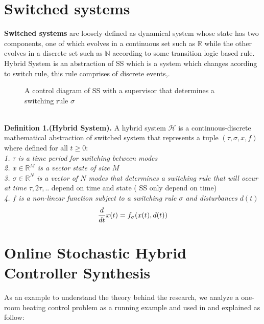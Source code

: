   \section{Switched systems}
    \label{sec:switchedsystems}
    \textbf{Switched systems} are loosely defined as dynamical 
    system whose state has two components, one of which evolves 
    in a continuous set such as $\mathbb{R}$  while the other 
    evolves in a discrete set such as $\mathbb{N}$ according to 
    some transition logic based rule. Hybrid System is an abstraction
    of \ac{SS} which is a system which changes acording to switch 
    rule, this rule comprises of discrete events,\citep{branicky1994stability}.    
    \begin{figure}[!hbt]
      \centering
      
      \captionsetup{format=hang}
      \caption{A control diagram of \ac{SS} with a supervisor that determines a switching rule $\sigma$}
      \label{fig:switchedsystem}
    \end{figure}
    \\
    \textbf{Definition 1.(Hybrid System).} A hybrid system $\mathcal{H}$ is a
    continuous-discrete mathematical abstraction of switched system that represents a 
    tuple $(\tau,\sigma,x,f)$ where defined for all $t \geqslant 0$: \\
    \emph{1. $\tau$ is a time period for switching between modes} \\
    \emph{2. $x \in \mathbb{R}^{M} $ is a vector state of size $M$} \\
    \emph{3. $\sigma \in \mathbb{R}^{N}$ is a vector of $N$ modes that determines a switching rule that will occur at time $\tau,2\tau,..$} depend on time and state ( \ac{SS} only depend on time)\\
    \emph{4. $f$ is a non-linear function subject to a switching rule $\sigma$ and disturbances $d(t)$} \\
    \begin{equation}
        \label{eq:hybridsystem}
        \frac{d}{dt}x(t) = f_{\sigma}(x(t),d(t)) \\
    \end{equation}

    \clearpage
  \section{Online Stochastic Hybrid Controller Synthesis}
    \label{sec:onlinestochastichybridcontroller}
    As an example to understand the theory behind the research, 
    we analyze  a one-room heating control problem as a 
    running example and  used in \cite{larsen2016online} 
    and explained as follow:

